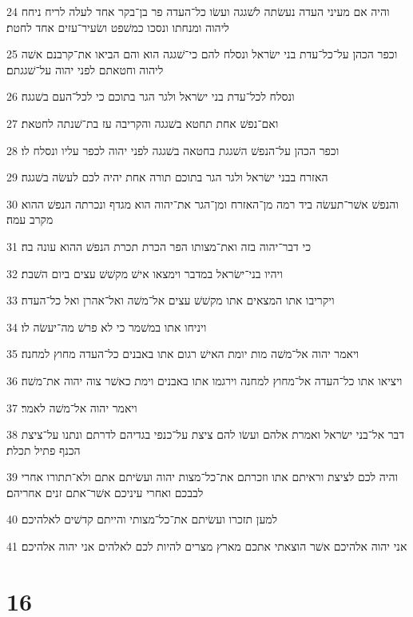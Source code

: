 \par 24 והיה אם מעיני העדה נעשׂתה לשׁגגה ועשׂו כל־העדה פר בן־בקר אחד לעלה לריח ניחח ליהוה ומנחתו ונסכו כמשׁפט ושׂעיר־עזים אחד לחטת׃
\par 25 וכפר הכהן על־כל־עדת בני ישׂראל ונסלח להם כי־שׁגגה הוא והם הביאו את־קרבנם אשׁה ליהוה וחטאתם לפני יהוה על־שׁגגתם׃
\par 26 ונסלח לכל־עדת בני ישׂראל ולגר הגר בתוכם כי לכל־העם בשׁגגה׃
\par 27 ואם־נפשׁ אחת תחטא בשׁגגה והקריבה עז בת־שׁנתה לחטאת׃
\par 28 וכפר הכהן על־הנפשׁ השׁגגת בחטאה בשׁגגה לפני יהוה לכפר עליו ונסלח לו׃
\par 29 האזרח בבני ישׂראל ולגר הגר בתוכם תורה אחת יהיה לכם לעשׂה בשׁגגה׃
\par 30 והנפשׁ אשׁר־תעשׂה ביד רמה מן־האזרח ומן־הגר את־יהוה הוא מגדף ונכרתה הנפשׁ ההוא מקרב עמה׃
\par 31 כי דבר־יהוה בזה ואת־מצותו הפר הכרת תכרת הנפשׁ ההוא עונה בה׃
\par 32 ויהיו בני־ישׂראל במדבר וימצאו אישׁ מקשׁשׁ עצים ביום השׁבת׃
\par 33 ויקריבו אתו המצאים אתו מקשׁשׁ עצים אל־משׁה ואל־אהרן ואל כל־העדה׃
\par 34 ויניחו אתו במשׁמר כי לא פרשׁ מה־יעשׂה לו׃
\par 35 ויאמר יהוה אל־משׁה מות יומת האישׁ רגום אתו באבנים כל־העדה מחוץ למחנה׃
\par 36 ויציאו אתו כל־העדה אל־מחוץ למחנה וירגמו אתו באבנים וימת כאשׁר צוה יהוה את־משׁה׃
\par 37 ויאמר יהוה אל־משׁה לאמר׃
\par 38 דבר אל־בני ישׂראל ואמרת אלהם ועשׂו להם ציצת על־כנפי בגדיהם לדרתם ונתנו על־ציצת הכנף פתיל תכלת׃
\par 39 והיה לכם לציצת וראיתם אתו וזכרתם את־כל־מצות יהוה ועשׂיתם אתם ולא־תתורו אחרי לבבכם ואחרי עיניכם אשׁר־אתם זנים אחריהם׃
\par 40 למען תזכרו ועשׂיתם את־כל־מצותי והייתם קדשׁים לאלהיכם׃
\par 41 אני יהוה אלהיכם אשׁר הוצאתי אתכם מארץ מצרים להיות לכם לאלהים אני יהוה אלהיכם׃

\chapter{16}

